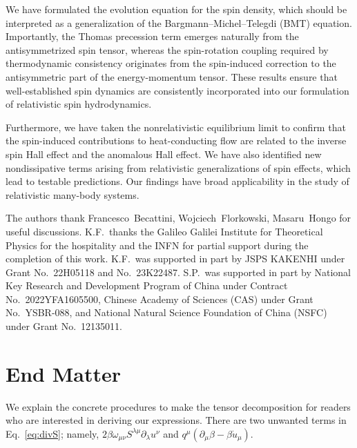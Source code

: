 \documentclass[prl,superscriptaddress,twocolumn,
  showpacs,preprintnumbers,amsmath,amssymb]{revtex4-1}
\newcommand{\p}{\partial}
\begin{document}
We have formulated the evolution equation for the spin density, which should be interpreted as a generalization of the Bargmann–Michel–Telegdi (BMT) equation.  Importantly, the Thomas precession term emerges naturally from the antisymmetrized spin tensor, whereas the spin-rotation coupling required by thermodynamic consistency originates from the spin-induced correction to the antisymmetric part of the energy-momentum tensor.  These results ensure that well-established spin dynamics are consistently incorporated into our formulation of relativistic spin hydrodynamics.

Furthermore, we have taken the nonrelativistic equilibrium limit to confirm that the spin-induced contributions to heat-conducting flow are related to the inverse spin Hall effect and the anomalous Hall effect.  We have also identified new nondissipative terms arising from relativistic generalizations of spin effects, which lead to testable predictions.
Our findings have broad applicability in the study of relativistic many-body systems.
\vspace{0.5em}

\begin{acknowledgments}
The authors thank
Francesco~Becattini,
Wojciech~Florkowski,
Masaru~Hongo
for useful discussions.
K.F.\ thanks the Galileo Galilei Institute for Theoretical Physics for the hospitality and the INFN for partial support during the completion of this work.
K.F.\ was supported in part by JSPS KAKENHI under Grant No.\ 22H05118 and No.\ 23K22487.
S.P.\ was supported in part by National Key Research and Development Program of China under Contract No.\ 2022YFA1605500, Chinese Academy of Sciences (CAS) under Grant No.\ YSBR-088, and National Natural Science Foundation of China (NSFC) under Grant No.\ 12135011.
\end{acknowledgments}











\section*{End Matter}

We explain the concrete procedures to make the tensor decomposition for readers who are interested in deriving our expressions.  There are two unwanted terms in Eq.~\eqref{eq:divS}; namely, $2\beta\omega_{\mu\nu}S^{\lambda\mu}\p_\lambda u^\nu$ and $q^\mu(\p_\mu\beta - \beta\dot{u}_\mu)$.
\end{document}

